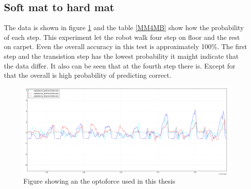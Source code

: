 \documentclass[USenglish]{ifimaster}  %
\begin{document}
\begin{table}[h]
\centering
{}
\caption{Hard matte 3 myk matte}
\label{hardmatSoftMat}
\end{table}
\FloatBarrier

\subsection{Soft mat to hard mat}
The data is shown in figure \ref{fig:MM_4_Resten_BGraf} and the table \ref{MM4MB} show how the probability of each step. This experiment let the robot walk four step on floor and the rest on carpet. Even the overall accuracy in this test is approximately 100\%. The first step and the transistion step has the lowest probability it maight indicate that the data differ. It also can be seen that at the fourth step there is. Except for that the overall is high probability of predicting correct. 

\begin{figure}[h]
    \centering
    \includegraphics[width=\textwidth,height=\textheight,keepaspectratio]{Figures/MM_4Resten_MB}
    \caption{Figure showing an the optoforce used in this thesis \cite{OptoforceFig}}
    \label{fig:MM_4_Resten_BGraf}
\end{figure}
\end{document}
